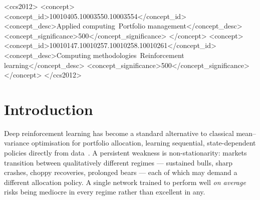 \documentclass[sigconf,anonymous,review]{acmart}
\begin{document}
\begin{abstract}
narrative manufactured by a sliding-window update scheme (a drawdown
advantage at $p{=}0.0025$, a walk-forward ranking, a COVID stress-test
story), and we identify measurable mechanisms behind the null:
near-one-hot posteriors that make soft and hard gating coincide on
${\sim}80\%$ of days, a $20\times$ gradient-occupancy imbalance that
starves rare-regime experts, regime features recoverable from the
agent's own state, and an always-fully-invested single-asset-class
action space that cannot express regime rotation. Architectural
comparisons in RL finance can be artifacts of training mechanics and
asymmetric tuning; we propose mechanics-and-regularisation ablations,
plus a no-gate control, as a standard robustness pass.
\end{abstract}

\begin{CCSXML}
<ccs2012>
<concept>
<concept_id>10010405.10003550.10003554</concept_id>
<concept_desc>Applied computing~Portfolio management</concept_desc>
<concept_significance>500</concept_significance>
</concept>
<concept>
<concept_id>10010147.10010257.10010258.10010261</concept_id>
<concept_desc>Computing methodologies~Reinforcement learning</concept_desc>
<concept_significance>500</concept_significance>
</concept>
</ccs2012>
\end{CCSXML}


\maketitle

\section{Introduction}

Deep reinforcement learning has become a standard alternative to classical
mean--variance optimisation for portfolio allocation, learning sequential,
state-dependent policies directly from data~\cite{jiang2017drl,liu2020finrl}.
A persistent weakness is non-stationarity: markets transition between
qualitatively different regimes --- sustained bulls, sharp crashes, choppy
recoveries, prolonged bears --- each of which may demand a different
allocation policy. A single network trained to perform well \emph{on
average} risks being mediocre in every regime rather than excellent in any.
\end{document}
